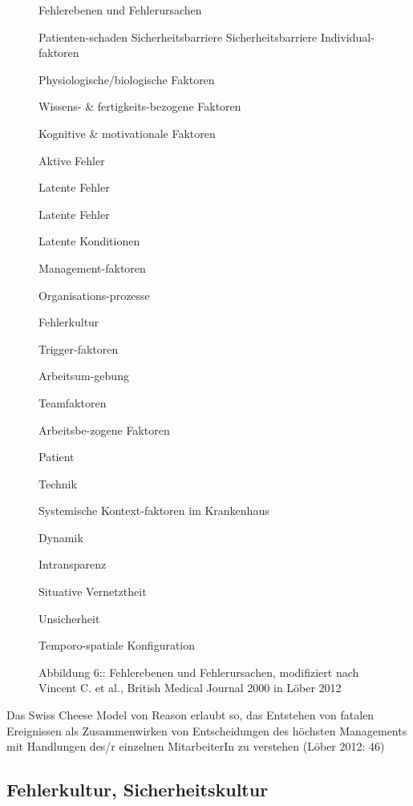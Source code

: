 \clearpage



\begin{figure}

Fehlerebenen und Fehlerursachen


Patienten-schaden
Sicherheitsbarriere
Sicherheitsbarriere
Individual-faktoren

Physiologische/biologische Faktoren

Wissens- \& fertigkeits-bezogene Faktoren

Kognitive \& motivationale Faktoren

Aktive Fehler

Latente Fehler

Latente Fehler

Latente Konditionen

Management-faktoren













Organisations-prozesse

Fehlerkultur

Trigger-faktoren

Arbeitsum-gebung

Teamfaktoren

Arbeitsbe-zogene Faktoren

Patient

Technik

Systemische Kontext-faktoren im Krankenhaus

Dynamik

Intransparenz

Situative Vernetztheit

Unsicherheit

Temporo-spatiale Konfiguration

\caption{Abbildung 6:: Fehlerebenen und Fehlerursachen, modifiziert
nach Vincent C. et al., British Medical Journal 2000 in
Löber 2012}
\end{figure}


Das Swiss Cheese Model von Reason erlaubt so, das Entstehen
von fatalen Ereignissen als Zusammenwirken von
Entscheidungen des höchsten Managements mit Handlungen
des/r einzelnen MitarbeiterIn zu verstehen (Löber 2012: 46)




\subsection{Fehlerkultur, Sicherheitskultur}

